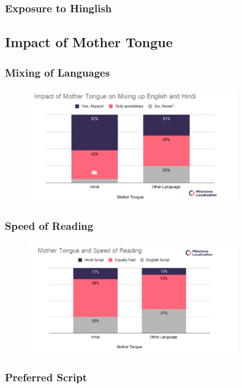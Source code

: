 \documentclass{article}
\begin{document}
\subsubsection{Exposure to Hinglish}

\subsection{Impact of Mother Tongue}

\subsubsection{Mixing of Languages}

\begin{figure}[H]
    \centering
    \includegraphics[width=0.8\textwidth]{plots/mother_mixing_language.png}
\end{figure}

\subsubsection{Speed of Reading}

\begin{figure}[H]
    \centering
    \includegraphics[width=0.8\textwidth]{plots/mother_faster_read.png}
\end{figure}

\subsubsection{Preferred Script}
\end{document}
